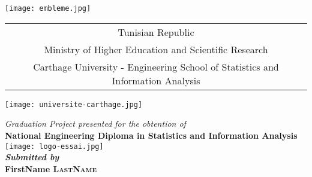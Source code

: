 \documentclass[a4paper, oneside, english, 12pt, final]{extreport}
\title{\reportSubject}
\author{\reportAuthor}
\newcommand{\reportTitle} {%
  \textsc{Graduation Project Report}
}
\newcommand{\reportAuthor} {%
  FirstName \textsc{LastName}%
}
\newcommand{\studyDepartment} {%
  Entreprise d'accueil %
}
\newcommand{\ESSAI} {%
   Engineering School of Statistics and Information Analysis
}
\begin{document}
\thispagestyle{empty}
\begin{titlepage}
\begin{center}


\texttt{[image: embleme.jpg]}\\

{%
  \fontsize{9pt}{9pt}\selectfont%
  \begin{tabular}{c}
    Tunisian Republic\\
    Ministry of Higher Education and Scientific Research \\%
    Carthage University - \ESSAI{}  \\
  \end{tabular}
}

\vspace{10pt}
\texttt{[image: universite-carthage.jpg]} \\


\vspace{10pt} {%
  \renewcommand*{\familydefault}{\defaultFont}
  \fontsize{46pt}{46pt}\selectfont%
}

\vspace{10pt}
\textit{Graduation Project presented for the obtention of
}\\

\vspace{10pt}
\textbf{\large National Engineering Diploma in Statistics and Information Analysis} \\

\texttt{[image: logo-essai.jpg]}\\

\vspace{10pt}
\textbf{\textit{Submitted by}}\\
\vspace{10pt} {%
  \fontsize{18pt}{18pt}\selectfont%
  \textbf{\reportAuthor}\\
}%


\end{center}
\end{titlepage}
\end{document}
